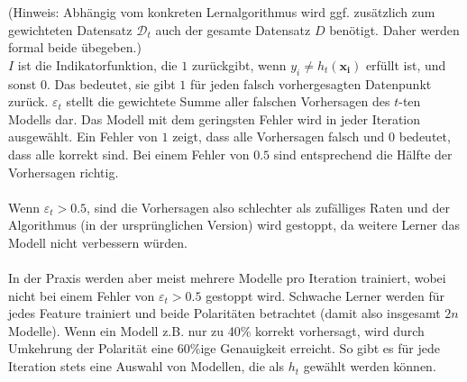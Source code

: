
(Hinweis: Abhängig vom konkreten Lernalgorithmus wird ggf. zusätzlich zum gewichteten Datensatz $\mathcal{D}_t$
auch der gesamte Datensatz $D$ benötigt. Daher werden formal beide übegeben.)\\

$I$ ist die Indikatorfunktion, die $1$ zurückgibt, wenn $y_i\neq h_t(\boldsymbol{x_i})$ erfüllt ist, und
sonst $0$. Das bedeutet, sie gibt $1$ für jeden falsch vorhergesagten Datenpunkt zurück. $\varepsilon_t$
stellt die gewichtete Summe aller falschen Vorhersagen des $t$-ten Modells dar. Das Modell
mit dem geringsten Fehler wird in jeder Iteration ausgewählt. Ein Fehler von $1$ zeigt, dass alle
Vorhersagen falsch und $0$ bedeutet, dass alle korrekt sind.
Bei einem Fehler von $0.5$ sind entsprechend die Hälfte der Vorhersagen richtig. \\\\
Wenn $\varepsilon_t > 0.5$, sind die Vorhersagen also schlechter
als zufälliges Raten und der Algorithmus (in der ursprünglichen Version) wird gestoppt,
da weitere Lerner das Modell nicht verbessern würden.\\\\
In der Praxis werden aber meist mehrere Modelle pro Iteration trainiert, wobei nicht bei einem Fehler von $\varepsilon_t>0.5$
gestoppt wird. Schwache Lerner werden für jedes Feature trainiert und beide Polaritäten betrachtet (damit also insgesamt
$2n$ Modelle). Wenn ein Modell z.B. nur zu 40\% korrekt vorhersagt, wird durch Umkehrung der Polarität eine 60\%ige Genauigkeit erreicht. So gibt es für
jede Iteration stets eine Auswahl von Modellen, die als $h_t$ gewählt werden können.